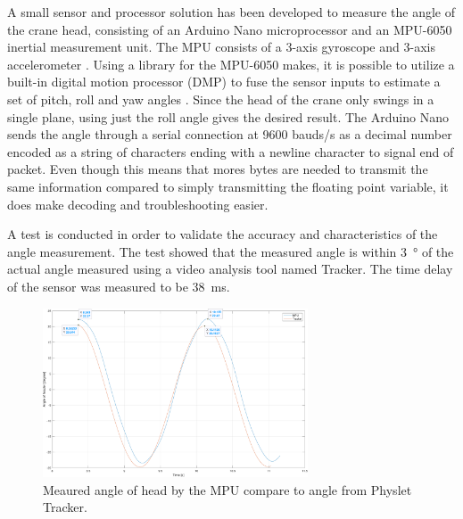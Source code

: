 A small sensor and processor solution has been developed to measure the angle of the crane head, consisting of an Arduino Nano microprocessor and an MPU-6050 inertial measurement unit. The MPU consists of a 3-axis gyroscope and 3-axis accelerometer \cite{MPU6050:online}. Using a library for the MPU-6050 makes, it is possible to utilize a built-in digital motion processor (DMP) to fuse the sensor inputs to estimate a set of pitch, roll and yaw angles \cite{MPU6050lib:online}. Since the head of the crane only swings in a single plane, using just the roll angle gives the desired result. The Arduino Nano sends the angle through a serial connection at 9600 bauds/s as a decimal number encoded as a string of characters ending with a newline character to signal end of packet. Even though this means that mores bytes are needed to transmit the same information compared to simply transmitting the floating point variable, it does make decoding and troubleshooting easier.

A test is conducted in order to validate the accuracy and characteristics of the angle measurement. The test showed that the measured angle is within \SI{3}{\degree} of the actual angle measured using a video analysis tool named Tracker. The time delay of the sensor was measured to be \SI{38}{ms}.

\begin{figure}[H]
    \centering
    \includegraphics[width=0.7\textwidth]{pictures/angle_of_header.pdf}
    \caption{Meaured angle of head by the MPU compare to angle from Physlet Tracker. }
    \label{fig:res_angle_of_header}
\end{figure}

